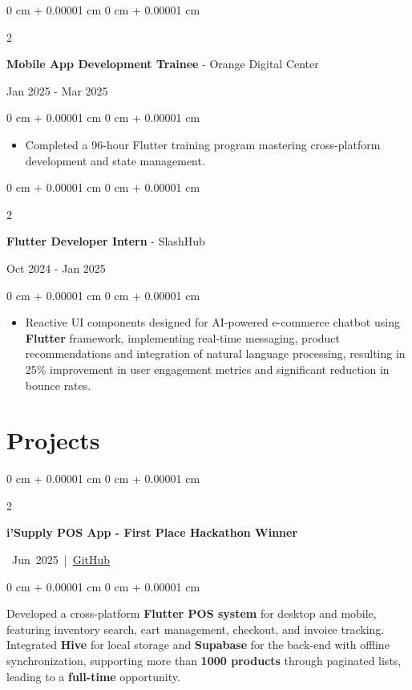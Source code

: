 \documentclass[10pt, letterpaper]{article}
\newenvironment{highlights}{
\begin{itemize}[
topsep=0.10 cm,
parsep=0.10 cm,
partopsep=0pt,
itemsep=0pt,
leftmargin=0 cm + 10pt
]
}{
\end{itemize}
} %
\newenvironment{onecolentry}{
\begin{adjustwidth}{
0 cm + 0.00001 cm
}{
0 cm + 0.00001 cm
}
}{
\end{adjustwidth}
} %
\newenvironment{twocolentry}[2][]{
\onecolentry
\def\secondColumn{#2}
\setcolumnwidth{\fill, 4.5 cm}
\begin{paracol}{2}
}{
\switchcolumn \raggedleft \secondColumn
\end{paracol}
\endonecolentry
} %
\let\hrefWithoutArrow\href
\begin{document}
\begin{twocolentry}{
Jan 2025 - Mar 2025
}
\textbf{\large Mobile App Development Trainee} - Orange Digital Center
\end{twocolentry}
\vspace{0.1 cm}
\begin{onecolentry}
\begin{highlights}
\item Completed a 96-hour Flutter training program mastering cross-platform development and state management.
\end{highlights}
\end{onecolentry}

\vspace{0.2 cm}

\begin{twocolentry}{
Oct 2024 - Jan 2025
}
\textbf{\large Flutter Developer Intern} - SlashHub
\end{twocolentry}
\vspace{0.1 cm}
\begin{onecolentry}
\begin{highlights}
\item Reactive UI components designed for AI-powered e-commerce chatbot using \textbf{Flutter} framework, implementing real-time messaging, product recommendations and integration of natural language processing, resulting in 25\% improvement in user engagement metrics and significant reduction in bounce rates.
\end{highlights}
\end{onecolentry}

\newpage


\section{Projects}

\vspace{0.10 cm}

\begin{twocolentry}{
\mbox{
Jun 2025 | \hrefWithoutArrow{https://github.com/KarimmYasser/isupply_app}{GitHub}}%
}
\textbf{i'Supply POS App - First Place Hackathon Winner}
\end{twocolentry}

\begin{onecolentry}
\begin{highlights}
Developed a cross-platform \textbf{Flutter POS system} for desktop and mobile, featuring inventory search, cart management, checkout, and invoice tracking. Integrated \textbf{Hive} for local storage and \textbf{Supabase} for the back-end with offline synchronization, supporting more than \textbf{ 1000 products} through paginated lists, leading to a \textbf{full-time} opportunity.
\end{highlights}
\end{onecolentry}
\end{document}
